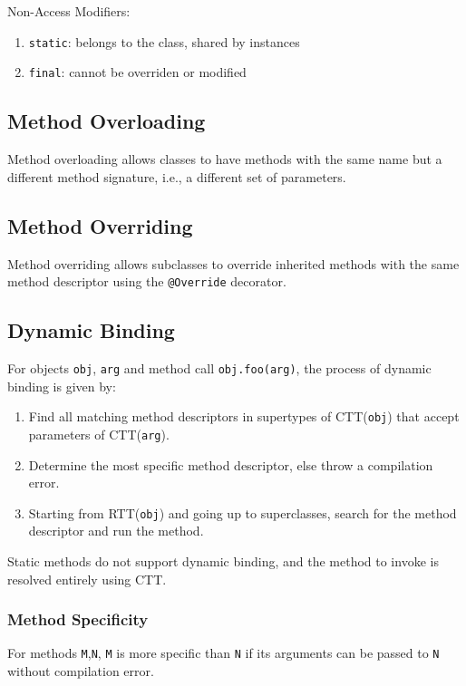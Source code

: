 \documentclass[12pt, a4paper]{article}
\begin{document}
\begin{multicols*}{3}
Non-Access Modifiers:
\begin{enumerate}[\roman*.]
  \item \lstinline|static|: belongs to the class, shared by instances 
  \item \lstinline|final|: cannot be overriden or modified
\end{enumerate}

\subsection{Method Overloading}
Method overloading allows classes to have methods with the same name but a different method signature, i.e., a different set of parameters.

\subsection{Method Overriding}
Method overriding allows subclasses to override inherited methods with the same method descriptor using the \lstinline|@Override| decorator.

\subsection{Dynamic Binding}
For objects \lstinline|obj|, \lstinline|arg| and method call \lstinline|obj.foo(arg)|, the process of dynamic binding is given by:
\begin{enumerate}[\arabic*.]
  \item Find all matching method descriptors in supertypes of CTT(\lstinline|obj|) that accept parameters of CTT(\lstinline|arg|).
  \item Determine the most specific method descriptor, else throw a compilation error.
  \item Starting from RTT(\lstinline|obj|) and going up to superclasses, search for the method descriptor and run the method.
\end{enumerate}

Static methods do not support dynamic binding, and the method to invoke is resolved entirely using CTT.

\subsubsection{Method Specificity}
For methods \lstinline|M|,\lstinline|N|, \lstinline|M| is more specific than \lstinline|N| if its arguments can be passed to \lstinline|N| without compilation error.


\end{multicols*}
\end{document}

